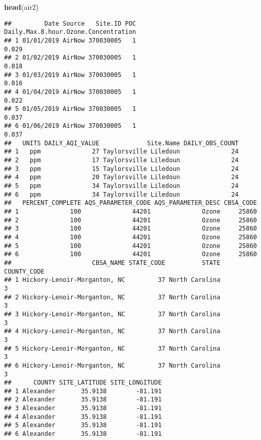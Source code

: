 \documentclass[]{article}
\newenvironment{Shaded}{\begin{snugshade}}{\end{snugshade}}
\newcommand{\KeywordTok}[1]{\textcolor[rgb]{0.13,0.29,0.53}{\textbf{#1}}}
\newcommand{\NormalTok}[1]{#1}
\begin{document}
\begin{Shaded}
\begin{Highlighting}[]
\KeywordTok{head}\NormalTok{(air2)}
\end{Highlighting}
\end{Shaded}

\begin{verbatim}
##         Date Source   Site.ID POC Daily.Max.8.hour.Ozone.Concentration
## 1 01/01/2019 AirNow 370030005   1                                0.029
## 2 01/02/2019 AirNow 370030005   1                                0.018
## 3 01/03/2019 AirNow 370030005   1                                0.016
## 4 01/04/2019 AirNow 370030005   1                                0.022
## 5 01/05/2019 AirNow 370030005   1                                0.037
## 6 01/06/2019 AirNow 370030005   1                                0.037
##   UNITS DAILY_AQI_VALUE             Site.Name DAILY_OBS_COUNT
## 1   ppm              27 Taylorsville Liledoun              24
## 2   ppm              17 Taylorsville Liledoun              24
## 3   ppm              15 Taylorsville Liledoun              24
## 4   ppm              20 Taylorsville Liledoun              24
## 5   ppm              34 Taylorsville Liledoun              24
## 6   ppm              34 Taylorsville Liledoun              24
##   PERCENT_COMPLETE AQS_PARAMETER_CODE AQS_PARAMETER_DESC CBSA_CODE
## 1              100              44201              Ozone     25860
## 2              100              44201              Ozone     25860
## 3              100              44201              Ozone     25860
## 4              100              44201              Ozone     25860
## 5              100              44201              Ozone     25860
## 6              100              44201              Ozone     25860
##                      CBSA_NAME STATE_CODE          STATE COUNTY_CODE
## 1 Hickory-Lenoir-Morganton, NC         37 North Carolina           3
## 2 Hickory-Lenoir-Morganton, NC         37 North Carolina           3
## 3 Hickory-Lenoir-Morganton, NC         37 North Carolina           3
## 4 Hickory-Lenoir-Morganton, NC         37 North Carolina           3
## 5 Hickory-Lenoir-Morganton, NC         37 North Carolina           3
## 6 Hickory-Lenoir-Morganton, NC         37 North Carolina           3
##      COUNTY SITE_LATITUDE SITE_LONGITUDE
## 1 Alexander       35.9138        -81.191
## 2 Alexander       35.9138        -81.191
## 3 Alexander       35.9138        -81.191
## 4 Alexander       35.9138        -81.191
## 5 Alexander       35.9138        -81.191
## 6 Alexander       35.9138        -81.191
\end{verbatim}
\end{document}
